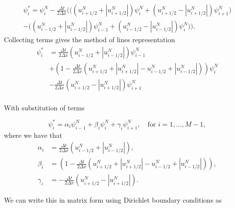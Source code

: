\documentclass[10pt, a4paper]{article}
\newcommand{\abs}[1]{\left\lvert#1\right\rvert}
\begin{document}
\begin{multline}
\psi_i^* = \psi_i^N - \frac{\Delta t}{2 \Delta x} \bigg( \Big( \left( u_{i+1/2}^N + \abs{u_{i+1/2}^N} \right) \psi_i^N
+ \left( u_{i+1/2}^N - \abs{u_{i+1/2}^N} \right) \psi_{i+1}^N \Big)
\\
- \Big( \left( u_{i-1/2}^N + \abs{u_{i-1/2}^N} \right) \psi_{i-1}^N
+ \left( u_{i-1/2}^N - \abs{u_{i-1/2}^N} \right) \psi_{i}^N \Big) \bigg).
\end{multline}
Collecting terms gives the method of lines representation
\begin{equation}
\begin{split}
\psi_i^* &=
\frac{\Delta t}{2 \Delta x} \left( u_{i-1/2}^N + \abs{u_{i-1/2}^N} \right) \psi_{i-1}^N\\
&+ \left(1 - \frac{\Delta t}{2 \Delta x} \left( u_{i+1/2}^N + \abs{u_{i+1/2}^N} - u_{i-1/2}^N + \abs{u_{i-1/2}^N} \right) \right) \psi_i^N\\
&-\frac{\Delta t}{2 \Delta x} \left( u_{i+1/2}^N - \abs{u_{i+1/2}^N} \right) \psi_{i+1}^N\\
\end{split}
\end{equation}

With substitution of terms

\begin{equation*}
\psi_i^* = \alpha_i \psi_{i-1}^N + \beta_i \psi_i^N +\gamma_i \psi_{i+1}^N, \quad \text{for } i=1,\ldots,M-1,
\end{equation*}
 where we have that
\begin{align*}
\alpha_i &= \frac{\Delta t}{2 \Delta x} \left( u_{i-1/2}^N + \abs{u_{i-1/2}^N} \right),\\
 \beta_i &= \left(1 - \frac{\Delta t}{2 \Delta x} \left( u_{i+1/2}^N + \abs{u_{i+1/2}^N} - u_{i-1/2}^N + \abs{u_{i-1/2}^N} \right) \right),\\
\gamma_i &= -\frac{\Delta t}{2 \Delta x} \left( u_{i+1/2}^N - \abs{u_{i+1/2}^N} \right).
\end{align*}

We can write this in matrix form using Dirichlet boundary conditions as
\end{document}
